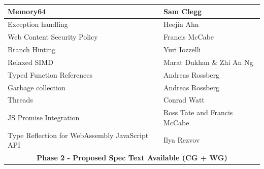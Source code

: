 \begin{table}[htbp]
\begin{tabular}{|ll|}
    \multicolumn{1}{|l|}{Memory64}                                       & Sam Clegg                                                                                                                       \\ \hline
    \multicolumn{1}{|l|}{Exception handling}                             & Heejin Ahn                                                                                                                      \\ \hline
    \multicolumn{1}{|l|}{Web Content Security Policy}                    & Francis McCabe                                                                                                                  \\ \hline
    \multicolumn{1}{|l|}{Branch Hinting}                                 & Yuri Iozzelli                                                                                                                   \\ \hline
    \multicolumn{1}{|l|}{Relaxed SIMD}                                   & Marat Dukhan \& Zhi An Ng                                                                                                       \\ \hline
    \multicolumn{1}{|l|}{Typed Function References}                      & Andreas Rossberg                                                                                                                \\ \hline
    \multicolumn{1}{|l|}{Garbage collection}                             & Andreas Rossberg                                                                                                                \\ \hline
    \multicolumn{1}{|l|}{Threads}                                        & Conrad Watt                                                                                                                     \\ \hline
    \multicolumn{1}{|l|}{JS Promise Integration}                         & Ross Tate and Francis McCabe                                                                                                    \\ \hline
    \multicolumn{1}{|l|}{Type Reflection for WebAssembly JavaScript API} & Ilya Rezvov                                                                                                                     \\ \hline
    \multicolumn{2}{|c|}{\textbf{Phase 2 - Proposed Spec Text Available (CG + WG)}}                                                                                                                        \\ \hline

\end{tabular}
\end{table}
